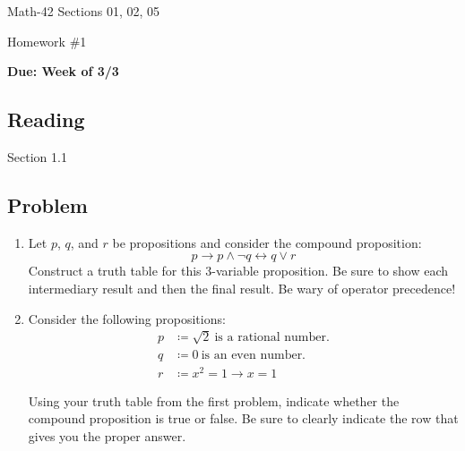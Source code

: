 \documentclass[letterpaper,12pt,fleqn]{article}
\renewcommand{\implies}{\rightarrow}
\renewcommand{\iff}{\leftrightarrow}
\begin{document}
\begin{center}
  \large
  Math-42 Sections 01, 02, 05

  \Large
  Homework \#1

  \large
  \textbf{Due: Week of 3/3}
\end{center}

\subsection*{Reading}

Section 1.1

\subsection*{Problem}

\begin{enumerate}
\item Let \(p\), \(q\), and \(r\)  be propositions and consider the compound proposition:
  \[p\implies p\land\lnot q\iff q\lor r\]
  Construct a truth table for this 3-variable proposition.  Be sure to show each intermediary result and then the
  final result.  Be wary of operator precedence!

\item Consider the following propositions:
  \begin{align*}
    p &\coloneqq\sqrt{2}\ \text{is a rational number.} \\
    q &\coloneqq0\ \text{is an even number.} \\
    r &\coloneqq x^2=1\implies x=1
  \end{align*}

  Using your truth table from the first problem, indicate whether the compound proposition is true or false.  Be sure
  to clearly indicate the row that gives you the proper answer.
\end{enumerate}
\end{document}
